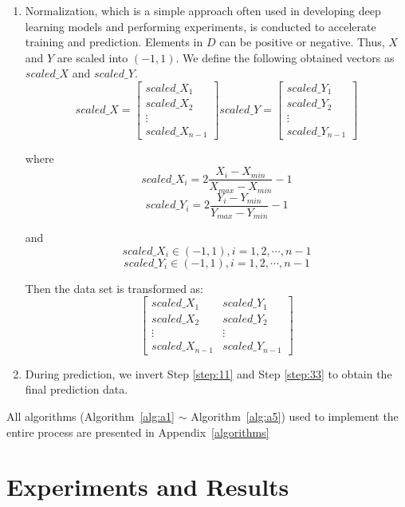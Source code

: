 \documentclass[twocolumn]{article}
\begin{document}
\begin{enumerate}[Step 1]
\item\label{step:33} Normalization, which is a simple approach often used in developing deep learning models and performing experiments, is conducted to accelerate training and prediction. Elements in $D$ can be positive or negative. Thus, $X$ and $Y$ are scaled into $(-1,1)$. We define the following obtained vectors as $scaled\_X$ and $scaled\_Y$. 
\[
scaled\_X = \begin{bmatrix}
scaled\_X_1\\
scaled\_X_2\\
\vdots\\
scaled\_X_{n-1}
\end{bmatrix}
scaled\_Y = \begin{bmatrix}
scaled\_Y_1\\
scaled\_Y_2\\
\vdots\\
scaled\_Y_{n-1}
\end{bmatrix}
\]
\par
where
\[
scaled\_X_i = 2\frac{X_i - X_{min}}{X_{max}-X_{min}}-1
\]
\[
scaled\_Y_i = 2\frac{Y_i - Y_{min}}{Y_{max}-Y_{min}}-1
\]
\par
and
\[ 
scaled\_X_i \in (-1,1), i = 1,2,\cdots,n-1
\]
\[
scaled\_Y_i \in (-1,1), i = 1,2,\cdots,n-1
\]
\par
Then the data set is transformed as:
\[
\begin{bmatrix}
scaled\_X_1 & scaled\_Y_1\\
scaled\_X_2 & scaled\_Y_2\\
\vdots&\vdots\\
scaled\_X_{n-1} & scaled\_Y_{n-1}
\end{bmatrix}
\]
\item\label{step:44} During prediction, we invert Step \ref{step:11} and Step \ref{step:33} to obtain the final prediction data.
\end{enumerate}
All algorithms (Algorithm~\ref{alg:a1} $\sim$ Algorithm~\ref{alg:a5}) used to implement the entire process are presented in Appendix~\ref{algorithms}


\section{Experiments and Results} \label{sec:exre}
\end{document}
